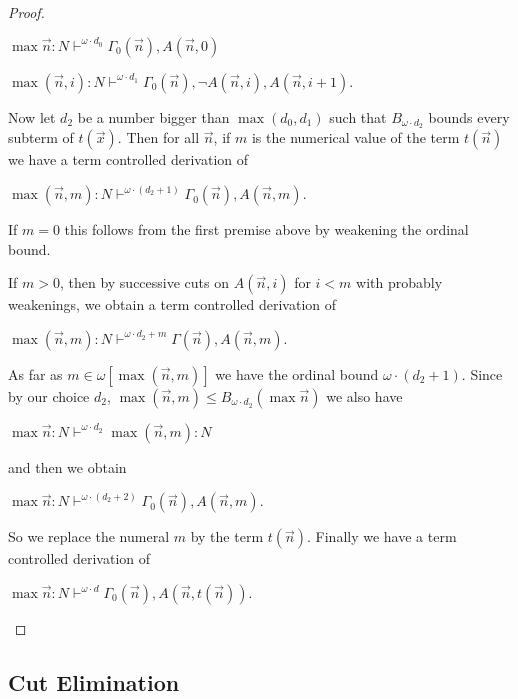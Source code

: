 \documentclass[8pt]{article}
\theoremstyle{definition}
\theoremstyle{definition}
\theoremstyle{definition}
\theoremstyle{definition}
\theoremstyle{definition}
\theoremstyle{definition}
\theoremstyle{definition}
\theoremstyle{definition}
\theoremstyle{definition}
\theoremstyle{definition}
\theoremstyle{definition}
\theoremstyle{definition}
\theoremstyle{definition}
\theoremstyle{question}
\begin{document}
\begin{proof}
\begin{enumerate}
    \begin{center}
      $\max \vec{n} : N \vdash^{\omega \cdot d_0} \Gamma_0(\vec{n}), A(\vec{n}, 0)$

      $\max(\vec{n}, i) : N \vdash^{\omega \cdot d_1} \Gamma_0(\vec{n}), \neg A(\vec{n}, i), A(\vec{n}, i + 1)$.
    \end{center}
  Now let $d_2$ be a number bigger than $\max(d_0, d_1)$ such that $B_{\omega \cdot d_2}$ bounds
  every subterm of $t(\vec{x})$. Then for all $\vec{n}$, if $m$ is the numerical value of the term $t(\vec{n})$
  we have a term controlled derivation of
  \begin{center}
    $\max(\vec{n}, m) : N \vdash^{\omega \cdot (d_2 + 1)} \Gamma_0(\vec{n}), A(\vec{n}, m)$.
  \end{center}
  If $m = 0$ this follows from the first premise above by weakening the ordinal bound.

  If $m > 0$, then by successive cuts on $A(\vec{n}, i)$ for $i < m$ with probably weakenings, we obtain
  a term controlled derivation of
  \begin{center}
    $\max(\vec{n}, m) : N \vdash^{\omega \cdot d_2 + m} \Gamma(\vec{n}), A(\vec{n}, m)$.
  \end{center}
  As far as $m \in \omega[\max(\vec{n}, m)]$ we have the ordinal bound $\omega \cdot (d_2 + 1)$.
  Since by our choice $d_2$, $\max(\vec{n}, m) \leq B_{\omega \cdot d_2}(\max \vec{n})$
  we also have
  \begin{center}
    $\max \vec{n} : N \vdash^{\omega \cdot d_2} \max(\vec{n}, m) : N$
  \end{center}
  and then we obtain
  \begin{center}
    $\max \vec{n} : N \vdash^{\omega \cdot (d_2 + 2)} \Gamma_0(\vec{n}), A(\vec{n}, m)$.
  \end{center}

  So we replace the numeral $m$ by the term $t(\vec{n})$. Finally we have a term controlled derivation of
  \begin{center}
    $\max \vec{n} : N \vdash^{\omega \cdot d} \Gamma_0(\vec{n}), A(\vec{n}, t(\vec{n}))$.
  \end{center}
  \end{enumerate}
\end{proof}

\subsection{Cut Elimination}
\end{document}
